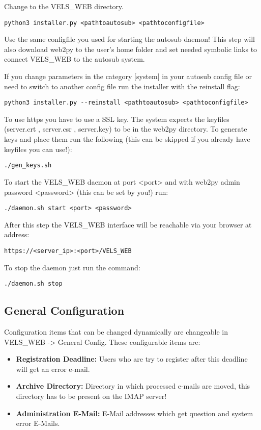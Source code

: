 Change to the VELS\_WEB directory.

\begin{verbatim}
python3 installer.py <pathtoautosub> <pathtoconfigfile>
\end{verbatim}

Use the same configfile you used for starting the autosub daemon! This step will
also download web2py to the user's home folder and set needed symbolic links to 
connect VELS\_WEB to the autosub system.

If you change parameters in the category $[$system$]$ in your autosub config file or need to switch to 
another config file run the installer with the reinstall flag:

\begin{verbatim}
python3 installer.py --reinstall <pathtoautosub> <pathtoconfigfile>
\end{verbatim}

To use https you have to use a SSL key. The system expects the keyfiles
(server.crt , server.csr , server.key) to be in the web2py directory. To
generate keys and place them run the following (this can be skipped if you 
already have keyfiles you can use!):

\begin{verbatim}
./gen_keys.sh    
\end{verbatim}

To start the VELS\_WEB daemon at port <port> and with web2py admin password 
<password> (this can be set by you!) run:
\begin{verbatim}
./daemon.sh start <port> <password> 
\end{verbatim}

After this step the VELS\_WEB interface will be reachable via your browser at
address:
\begin{verbatim}
https://<server_ip>:<port>/VELS_WEB
\end{verbatim}

To stop the daemon just run the command:

\begin{verbatim}
./daemon.sh stop
\end{verbatim}

\subsection{General Configuration}\label{sub:generalconfig}
Configuration items that can be changed dynamically are changeable in VELS\_WEB ->
General Config. These configurable items are:
\begin{itemize}
\item {\bf Registration Deadline:} Users who are try to register after this deadline will
    get an error e-mail.
\item {\bf Archive Directory:} Directory in which processed e-mails are moved, this
    directory has to be present on the IMAP server!
\item {\bf Administration E-Mail:} E-Mail addresses which get question and system error E-Mails.

\end{itemize}

